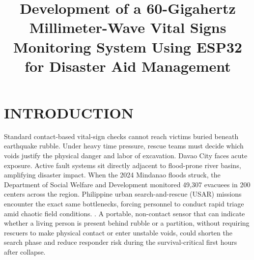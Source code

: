 \documentclass[10pt,conference]{IEEEtran}
\begin{document}
\title{Development of a 60-Gigahertz Millimeter-Wave Vital Signs Monitoring System Using ESP32 for Disaster Aid Management}

\author{
\and
{}
\and
{}
}

\maketitle
\thispagestyle{plain}

\section{INTRODUCTION}
Standard contact-based vital-sign checks cannot reach victims buried beneath earthquake rubble. Under heavy time pressure, rescue teams must decide which voids justify the physical danger and labor of excavation. Davao City faces acute exposure. Active fault systems sit directly adjacent to flood-prone river basins, amplifying disaster impact. When the 2024 Mindanao floods struck, the Department of Social Welfare and Development monitored 49,307 evacuees in 200 centers across the region. Philippine urban search-and-rescue (USAR) missions encounter the exact same bottlenecks, forcing personnel to conduct rapid triage amid chaotic field conditions.  \cite{jolly2024,avelino2024,marquez2024}. A portable, non-contact sensor that can indicate whether a living person is present behind rubble or a partition, without requiring rescuers to make physical contact or enter unstable voids, could shorten the search phase and reduce responder risk during the survival-critical first hours after collapse.
\end{document}
